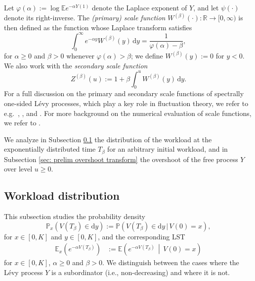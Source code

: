 \documentclass[reqno,12pt]{amsart}
\newcommand{\ws}[1]{{\color{blue} #1}}
\begin{document}
Let $\varphi(\alpha) := \log \mathbb{E}e^{-\alpha Y(1)}$ denote the Laplace exponent of $Y$, and let $\psi(\cdot)$ denote its right-inverse. The {\it (primary) scale function} $W^{(\beta)}(\cdot):\mathbb{R}\to[0,\infty)$ is then defined as the function whose Laplace transform satisfies
\begin{equation*}
    \int_0^\infty e^{-\alpha y} W^{(\beta)}(y)\,\mathrm{d}y = \frac{1}{\varphi(\alpha) - \beta},
\end{equation*}
for $\alpha \geqslant 0$ and $\beta>0$ whenever $\varphi(\alpha) > \beta$; we define $W^{(\beta)}(y):=0$ for $y<0$. We also work with the \textit{secondary scale function}
\begin{equation*}
    Z^{(\beta)}(u) := 1 + \beta\int_0^u W^{(\beta)}(y)\,\mathrm{d}y.
\end{equation*}
For a full discussion on the primary and secondary scale functions of spectrally one-sided L\'evy processes, which play a key role in fluctuation theory, we refer to e.g.\ \cite[\S VIII.3]{KYP}, \cite[\S VII.2]{BER}, and \cite{KUZ}. For more background on the numerical evaluation of scale functions, we refer to \cite{SUR}.

We analyze in Subsection \ref{ssec: workload dist levy} the distribution of the workload at the exponentially distributed time $T_\beta$ for an arbitrary initial workload, and in Subsection \ref{sec: prelim overshoot transform} the overshoot of the free process $Y$ over level $u\geqslant0$.


\subsection{Workload distribution}\label{ssec: workload dist levy}
This subsection studies the probability density
\begin{equation}\label{eq:cdf}
    \mathbb{P}_x(V(T_\beta) \in \mathrm{d}y) := \mathbb{P}(V(T_\beta) \in \mathrm{d}y\,|\,V(0) = x),
\end{equation}
for $x\in[0,K]$ and $y\in[0,K]$, and the corresponding LST
\begin{align}\label{eq:lst}
    \mathbb{E}_x \left(e^{-\alpha V(T_\beta)}\right) &:= \mathbb{E} \left(e^{-\alpha V(T_\beta)}\,\middle| \,V(0) = x\right)
\end{align}
for $x\in[0,K]$, $\alpha\geqslant 0$ and $\beta>0$. We distinguish between the cases where the L\'evy process $Y$ is a subordinator (i.e., non-decreasing) and where it is not. 
\end{document}

